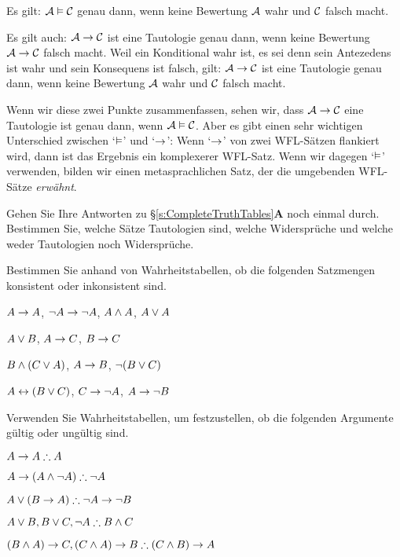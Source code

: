 Es gilt: $\mathcal{A} \vDash \mathcal{C}$ genau dann, wenn keine Bewertung $\mathcal{A}$ wahr und $\mathcal{C}$ falsch macht. 

Es gilt auch: $\mathcal{A} \rightarrow \mathcal{C}$ ist eine Tautologie genau dann, wenn keine Bewertung $\mathcal{A} \rightarrow \mathcal{C}$ falsch macht. Weil ein Konditional wahr ist, es sei denn sein Antezedens ist wahr und sein Konsequens ist falsch, gilt: $\mathcal{A} \rightarrow \mathcal{C}$ ist eine Tautologie genau dann, wenn keine Bewertung $\mathcal{A}$ wahr und $\mathcal{C}$ falsch macht. 

Wenn wir diese zwei Punkte zusammenfassen, sehen wir, dass $\mathcal{A} \rightarrow \mathcal{C}$ eine Tautologie ist genau dann, wenn $\mathcal{A} \vDash \mathcal{C}$. Aber es gibt einen sehr wichtigen Unterschied zwischen `$\vDash$' und `$\rightarrow$':
Wenn `$\rightarrow$' von zwei WFL-Sätzen flankiert wird, dann ist das Ergebnis ein komplexerer WFL-Satz. Wenn wir dagegen `$\vDash$' verwenden, bilden wir einen metasprachlichen Satz, der die umgebenden WFL-Sätze \emph{erwähnt}. 

\practiceproblems
\problempart
Gehen Sie Ihre Antworten zu \S\ref{s:CompleteTruthTables}\textbf{A} noch einmal durch. Bestimmen Sie, welche Sätze Tautologien sind, welche Widersprüche und welche weder Tautologien noch Widersprüche.

\solutions

\problempart
\label{pr.TT.satisfiable}
Bestimmen Sie anhand von Wahrheitstabellen, ob die folgenden Satzmengen konsistent oder inkonsistent sind.
\begin{earg}
\item $A\rightarrow A$, $\neg A \rightarrow \neg A$, $A\wedge A$, $A\vee A$ %
\item $A\vee B$, $A\rightarrow C$, $B\rightarrow C$ %
\item $B\wedge(C\vee A)$, $A\rightarrow B$, $\neg(B\vee C)$  %
\item $A\leftrightarrow(B\vee C)$, $C\rightarrow \neg A$, $A\rightarrow \neg B$ %
\end{earg}


\solutions

\problempart
\label{pr.TT.valid}
Verwenden Sie Wahrheitstabellen, um festzustellen, ob die folgenden Argumente gültig oder ungültig sind.
\begin{earg}
\item $A\eif A \therefore A$ %
\item $A\eif(A\eand\enot A) \therefore \enot A$ %
\item $A\eor(B\eif A) \therefore \enot A \eif \enot B$ %
\item $A\eor B, B\eor C, \enot A \therefore B \eand C$ %
\item $(B\eand A)\eif C, (C\eand A)\eif B \therefore (C\eand B)\eif A$ %
\end{earg}

